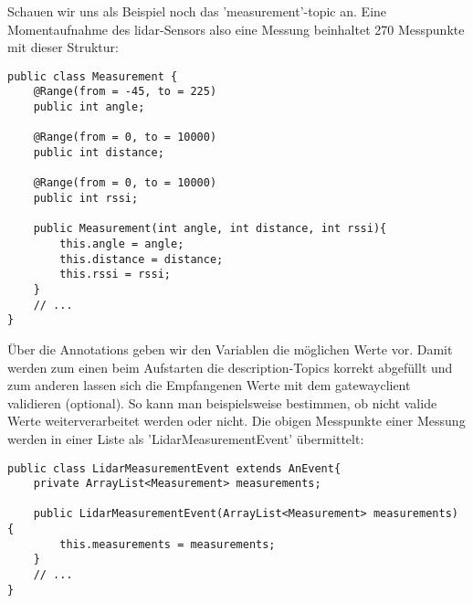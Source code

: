 Schauen wir uns als Beispiel noch das 'measurement'-\Gls{topic} an. Eine Momentaufnahme des \acrshort{lidar}-Sensors also eine Messung beinhaltet 270 Messpunkte mit dieser Struktur:
\begin{lstlisting}[caption={TiM55x-Service - Struktur der Messpunkte},label={lst:lidar_measurement}]
public class Measurement {
    @Range(from = -45, to = 225)
    public int angle;
    
    @Range(from = 0, to = 10000)
    public int distance;
    
    @Range(from = 0, to = 10000)
    public int rssi;

    public Measurement(int angle, int distance, int rssi){
        this.angle = angle;
        this.distance = distance;
        this.rssi = rssi;
    }
    // ...
}
\end{lstlisting}
Über die Annotations geben wir den Variablen die möglichen Werte vor. Damit werden zum einen beim Aufstarten die \Gls{description}-Topics korrekt abgefüllt und zum anderen lassen sich die Empfangenen Werte mit dem \Gls{gatewayclient} validieren (optional). So kann man beispielsweise bestimmen, ob nicht valide Werte weiterverarbeitet werden oder nicht.
Die obigen Messpunkte einer Messung werden in einer Liste als 'LidarMeasurementEvent' übermittelt:
\begin{lstlisting}[caption={TiM55x-Service - Struktur des 'LidarMeasurementEvent'},label={lst:lidar_measurementevent}]
public class LidarMeasurementEvent extends AnEvent{
    private ArrayList<Measurement> measurements;
    
    public LidarMeasurementEvent(ArrayList<Measurement> measurements) {
        this.measurements = measurements;
    }
    // ...
}
\end{lstlisting}

